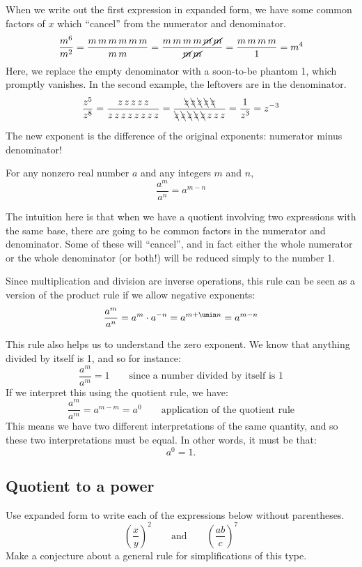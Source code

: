 When we write out the first expression in expanded form, we have some common factors of $x$ which ``cancel'' from the numerator and denominator.
\[\frac{m^6}{m^2} = \frac{m\,m\,m\,m\,m\,m}{m\,m} = \frac{m\,m\,m\,m\,\cancel{m}\,\cancel{m}}{\cancel{m}\,\cancel{m}} = \frac{m\,m\,m\,m}{1} = m^4\]
Here, we replace the empty denominator with a soon-to-be phantom 1, which promptly vanishes. In the second example, the leftovers are in the denominator.
\[\frac{z^5}{z^8} = \frac{z\,z\,z\,z\,z}{z\,z\,z\,z\,z\,z\,z\,z} = \frac{\bcancel{z}\,\bcancel{z}\,\bcancel{z}\,\bcancel{z}\,\bcancel{z}}{\bcancel{z}\,\bcancel{z}\,\bcancel{z}\,\bcancel{z}\,\bcancel{z}\,z\,z\,z} = \frac{1}{z^3} = z^{-3}\]

The new exponent is the difference of the original exponents: numerator minus denominator!

\begin{boxdef}
For any nonzero real number $a$ and any integers $m$ and $n$, \[\frac{a^m}{a^n} = a^{m-n}\]
\end{boxdef}

The intuition here is that when we have a quotient involving two expressions with the same base, there are going to be common factors in the numerator and denominator. Some of these will ``cancel'', and in fact either the whole numerator or the whole denominator (or both!) will be reduced simply to the number 1.

Since multiplication and division are inverse operations, this rule can be seen as a version of the product rule if we allow negative exponents:
\[\frac{a^m}{a^n} = a^m \cdot a^{-n} = a^{m+\umin n} = a^{m-n}\]

This rule also helps us to understand the zero exponent. We know that anything divided by itself is 1, and so for instance: \[\frac{a^m}{a^m} = 1 \qquad\text{since a number divided by itself is 1}\]
If we interpret this using the quotient rule, we have: \[\frac{a^m}{a^m} = a^{m-m} = a^0 \qquad\text{application of the quotient rule}\]
This means we have two different interpretations of the same quantity, and so these two interpretations must be equal. In other words, it must be that: \[a^0 = 1.\]


\subsection{Quotient to a power}

\begin{boxexplore}[Derivation \#6]
Use expanded form to write each of the expressions below without parentheses.
\[\left(\frac{x}{y}\right)^2 \qquad\text{and}\qquad \left(\frac{ab}{c}\right)^7\]
Make a conjecture about a general rule for simplifications of this type.
\end{boxexplore}

